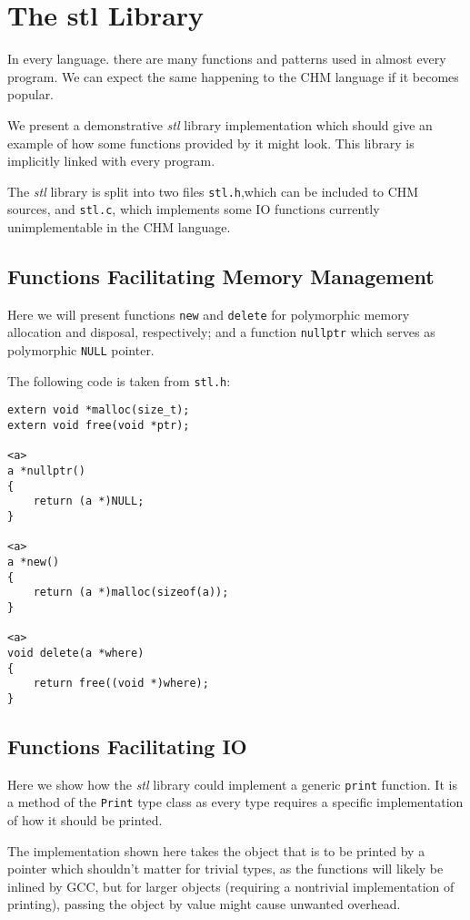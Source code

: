 \chapter{The stl Library}

In every language. there are many functions and patterns used in almost every program. We can expect the same happening to the CHM language if it becomes popular.

We present a demonstrative \emph{stl} library implementation which should give an example of how some functions provided by it might look. This library is implicitly linked with every program.

The \emph{stl} library is split into two files \lstinline[language=sh]{stl.h},which can be included to CHM sources, and \lstinline[language=sh]{stl.c}, which implements some IO functions currently unimplementable in the CHM language.


\section{Functions Facilitating Memory Management}

Here we will present functions \lstinline{new} and \lstinline{delete} for polymorphic memory allocation and disposal, respectively; and a function \lstinline{nullptr} which serves as polymorphic \lstinline{NULL} pointer.

The following code is taken from \lstinline[language=sh]{stl.h}:

\begin{lstlisting}
extern void *malloc(size_t);
extern void free(void *ptr);

<a>
a *nullptr()
{
    return (a *)NULL;
}

<a>
a *new()
{
    return (a *)malloc(sizeof(a));
}

<a>
void delete(a *where)
{
    return free((void *)where);
}
\end{lstlisting}

\section{Functions Facilitating IO}

Here we show how the \emph{stl} library could implement a generic \lstinline{print} function. It is a method of the \lstinline{Print} type class as every type requires a specific implementation of how it should be printed.

The implementation shown here takes the object that is to be printed by a pointer which shouldn't matter for trivial types, as the functions will likely be inlined by GCC, but for larger objects (requiring a nontrivial implementation of printing), passing the object by value might cause unwanted overhead.

